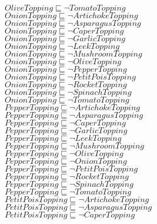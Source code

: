 \documentclass[a4paper,10pt]{article}
\begin{document}
 $OliveTopping \sqsubseteq  \lnot TomatoTopping$\\ 
 $OnionTopping \sqsubseteq  \lnot ArtichokeTopping$\\ 
 $OnionTopping \sqsubseteq  \lnot AsparagusTopping$\\ 
 $OnionTopping \sqsubseteq  \lnot CaperTopping$\\ 
 $OnionTopping \sqsubseteq  \lnot GarlicTopping$\\ 
 $OnionTopping \sqsubseteq  \lnot LeekTopping$\\ 
 $OnionTopping \sqsubseteq  \lnot MushroomTopping$\\ 
 $OnionTopping \sqsubseteq  \lnot OliveTopping$\\ 
 $OnionTopping \sqsubseteq  \lnot PepperTopping$\\ 
 $OnionTopping \sqsubseteq  \lnot PetitPoisTopping$\\ 
 $OnionTopping \sqsubseteq  \lnot RocketTopping$\\ 
 $OnionTopping \sqsubseteq  \lnot SpinachTopping$\\ 
 $OnionTopping \sqsubseteq  \lnot TomatoTopping$\\ 
 $PepperTopping \sqsubseteq  \lnot ArtichokeTopping$\\ 
 $PepperTopping \sqsubseteq  \lnot AsparagusTopping$\\ 
 $PepperTopping \sqsubseteq  \lnot CaperTopping$\\ 
 $PepperTopping \sqsubseteq  \lnot GarlicTopping$\\ 
 $PepperTopping \sqsubseteq  \lnot LeekTopping$\\ 
 $PepperTopping \sqsubseteq  \lnot MushroomTopping$\\ 
 $PepperTopping \sqsubseteq  \lnot OliveTopping$\\ 
 $PepperTopping \sqsubseteq  \lnot OnionTopping$\\ 
 $PepperTopping \sqsubseteq  \lnot PetitPoisTopping$\\ 
 $PepperTopping \sqsubseteq  \lnot RocketTopping$\\ 
 $PepperTopping \sqsubseteq  \lnot SpinachTopping$\\ 
 $PepperTopping \sqsubseteq  \lnot TomatoTopping$\\ 
 $PetitPoisTopping \sqsubseteq  \lnot ArtichokeTopping$\\ 
 $PetitPoisTopping \sqsubseteq  \lnot AsparagusTopping$\\ 
 $PetitPoisTopping \sqsubseteq  \lnot CaperTopping$\\ 
\end{document}
